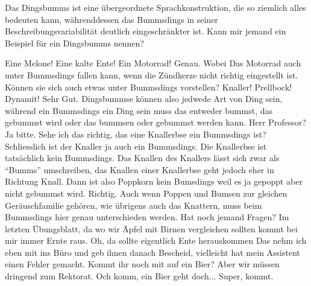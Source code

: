 \begin{verseplay}[7em]
\s\Prof {} Das Dingsbumms ist eine übergeordnete Sprachkonstruktion, die so ziemlich alles bedeuten kann, währenddessen das Bummsdings  in seiner Beschreibungsvariabilität deutlich eingeschränkter ist. Kann mir jemand ein Beispiel für ein Dingsbumms nennen?

\s\Studc Eine Melone! 
\s\Studa Eine kalte Ente! 
\s\Studb Ein Motorrad! 
\s\Prof Genau. Wobei Das Motorrad auch unter Bummsdings fallen kann, wenn die Zündkerze nicht richtig eingestellt ist. Können sie sich auch etwas unter Bummsdings vorstellen?
\s\Studa Knaller! 
\s\Studb Prellbock! 
\s\Gimli Dynamit! 
\s\Prof Sehr Gut. Dingsbummse können also jedwede Art von Ding sein, während ein Bummsdings ein Ding sein muss das entweder bummst, das gebummst wird oder das bummsen oder gebummst werden kann. 
\s\Studb Herr Professor?
\s\Prof Ja bitte.
\s\Studb Sehe ich das richtig, das eine Knallerbse ein Bummsdings ist? Schliesslich ist der Knaller ja auch ein Bummsdings.
\s\Prof {} Die Knallerbse ist tatsächlich kein Bummsdings. Das Knallen des Knallers lässt sich zwar als ``Bumms'' umschreiben, das Knallen einer Knallerbse geht jedoch eher in Richtung Knall.
\s\Studb Dann ist also Poppkorn kein Bumsdings weil es ja gepoppt aber nicht gebummst wird.
\s\Prof Richtig. Auch wenn Poppen und Bumsen zur gleichen Geräuschfamilie gehören, wie übrigens auch das Knattern, muss beim Bummsdings hier genau unterschieden werden. Hat noch jemand Fragen?
\s\Studa Im letzten Übungsblatt, da wo wir Äpfel mit Birnen vergleichen sollten kommt bei mir immer Ernte raus.
\s\Prof Oh, da sollte eigentlich Ente herauskommen  Das nehm ich eben mit ins Büro und geb ihnen danach Bescheid, vielleicht hat mein Assistent einen Fehler gemacht.
\s\Studa {} Kommt ihr noch mit auf ein Bier?
\s\Gimli Aber wir müssen dringend zum  Rektorat.
\s\Sum Och komm, ein Bier geht doch...
\s\Studb Super, kommt.

\end{verseplay}

